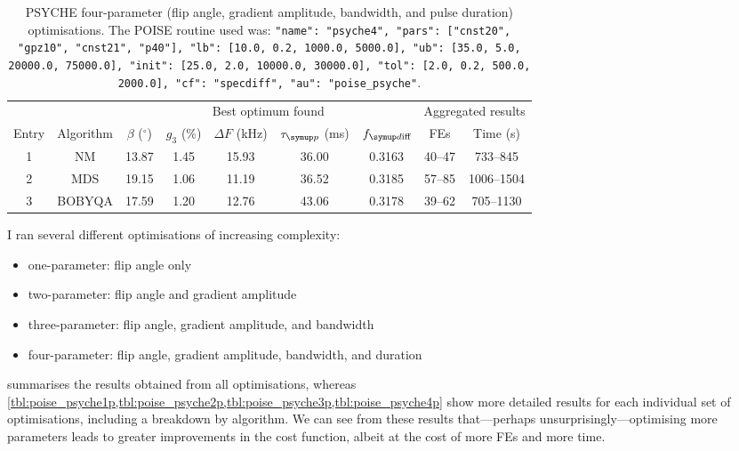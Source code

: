 \begin{table}
    \centering
    \begin{tabular}{ccccccccc}
        \toprule
              &           & \multicolumn{5}{c}{Best optimum found} & \multicolumn{2}{c}{Aggregated results} \\
                            \cmidrule(lr){3-7}                       \cmidrule(lr){8-9}
        Entry & Algorithm & $\beta$ ($^\circ$) & $g_3$ (\%) & $\Delta F$ (\unit{\kHz}) & $\taup$ (\unit{\ms}) & $\fdiff$ & FEs    & Time (\unit{\s}) \\
        \midrule
        1     & NM        & 13.87              & 1.45       & 15.93                  & 36.00              & 0.3163          & 40--47 & 733--845       \\
        2     & MDS       & 19.15              & 1.06       & 11.19                  & 36.52              & 0.3185          & 57--85 & 1006--1504     \\
        3     & BOBYQA    & 17.59              & 1.20       & 12.76                  & 43.06              & 0.3178          & 39--62 & 705--1130      \\
        \bottomrule
    \end{tabular}
    \caption[PSYCHE four-parameter optimisations]{
        PSYCHE four-parameter (flip angle, gradient amplitude, bandwidth, and pulse duration) optimisations.
        The POISE routine used was: \texttt{{"name": "psyche4", "pars": ["cnst20", "gpz10", "cnst21", "p40"], "lb": [10.0, 0.2, 1000.0, 5000.0], "ub": [35.0, 5.0, 20000.0, 75000.0], "init": [25.0, 2.0, 10000.0, 30000.0], "tol": [2.0, 0.2, 500.0, 2000.0], "cf": "specdiff", "au": "poise_psyche"}}.
    }
    \label{tbl:poise_psyche4p}
\end{table}

I ran several different optimisations of increasing complexity:
\begin{itemize}
    \item one-parameter: flip angle only
    \item two-parameter: flip angle and gradient amplitude
    \item three-parameter: flip angle, gradient amplitude, and bandwidth
    \item four-parameter: flip angle, gradient amplitude, bandwidth, and duration
\end{itemize}

 summarises the results obtained from all optimisations, whereas \cref{tbl:poise_psyche1p,tbl:poise_psyche2p,tbl:poise_psyche3p,tbl:poise_psyche4p} show more detailed results for each individual set of optimisations, including a breakdown by algorithm.
We can see from these results that---perhaps unsurprisingly---optimising more parameters leads to greater improvements in the cost function, albeit at the cost of more FEs and more time.

